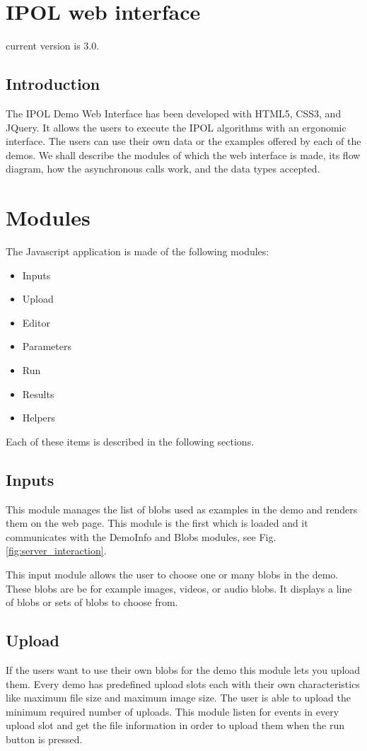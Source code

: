 \section{IPOL web interface}

current version is 3.0.

\subsection{Introduction}
The IPOL Demo Web Interface has been developed with HTML5, CSS3, and JQuery. 
It allows the users to execute the IPOL algorithms with an ergonomic interface. The users can use their own data or the examples offered by each of the demos. We shall describe the modules of which the web interface is made, its flow diagram, how the asynchronous calls work, and the data types accepted.

\section{Modules}
The Javascript application is made of the following modules:

\begin{itemize}
	\item Inputs
	\item Upload
	\item Editor
	\item Parameters
	\item Run
	\item Results
	\item Helpers 
\end{itemize}

Each of these items is described in the following sections.

\subsection{Inputs}
This module manages the list of blobs used as examples in the demo and renders them on the web page. This module is the first which is loaded and it communicates with the DemoInfo and Blobs modules, see Fig. \ref{fig:server_interaction}.

This input module allows the user to choose one or many blobs in the demo. These blobs are be for example images, videos, or audio blobs. It displays a line of blobs or sets of blobs to choose from.


\subsection{Upload}
If the users want to use their own blobs for the demo this module lets you upload them. Every demo has predefined 
upload slots each with their own characteristics like maximum file size and maximum image size. The user is able to upload the 
minimum required number of uploads. This module listen for events in every upload slot and get the file information in order to 
upload them when the run button is pressed.


